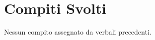 \documentclass[../verbale-2017-03-14.tex]{subfiles}
\begin{document}
	\section{Compiti Svolti}
		Nessun compito assegnato da verbali precedenti.
\end{document}
